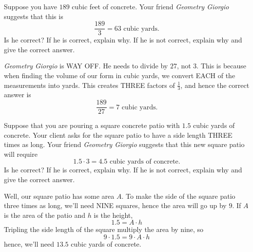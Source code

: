 \documentclass[handout,nooutcomes,noauthor]{ximera}
\begin{document}
\begin{question}
  Suppose you have $189$ cubic feet of concrete. Your friend \textit{Geometry
    Giorgio} suggests that this is
  \[
  \frac{189}{3} = 63 \text{ cubic yards}.
  \]
  Is he correct? If he is correct, explain why. If he is not correct,
  explain why and give the correct answer.
  \begin{freeResponse}
     \textit{Geometry Giorgio} is WAY OFF. He needs to divide by $27$,
     not $3$. This is because when finding the volume of our form in
     cubic yards, we convert EACH of the measurements into yards. This
     creates THREE factors of $\frac{1}{3}$, and hence the correct
     answer is
     \[
     \frac{189}{27} = 7 \text{ cubic yards}.
     \]
  \end{freeResponse}
\end{question}
\mynewpage


\begin{question}
  Suppose that you are pouring a square concrete patio with $1.5$
  cubic yards of concrete. Your client asks for the square patio to
  have a side length THREE times as long.  Your friend \textit{Geometry Giorgio}
  suggests that this new square patio will require
  \[
  1.5\cdot  3 = 4.5 \text{ cubic yards of concrete}.
  \]
  Is he correct? If he is correct, explain why. If he is not correct,
  explain why and give the correct answer.
  \begin{freeResponse}
    Well, our square patio has some area $A$. To make the side of the
    square patio three times as long, we'll need NINE squares, hence
    the area will go up by $9$. If $A$ is the area of the patio and
    $h$ is the height,
    \[
    1.5 = A \cdot h
    \]
    Tripling the side length of the square multiply the area by nine, so
    \[
    9\cdot 1.5 = 9\cdot A \cdot h 
    \]
    hence, we'll need $13.5$ cubic yards of concrete.
  \end{freeResponse}
\end{question}
\end{document}
